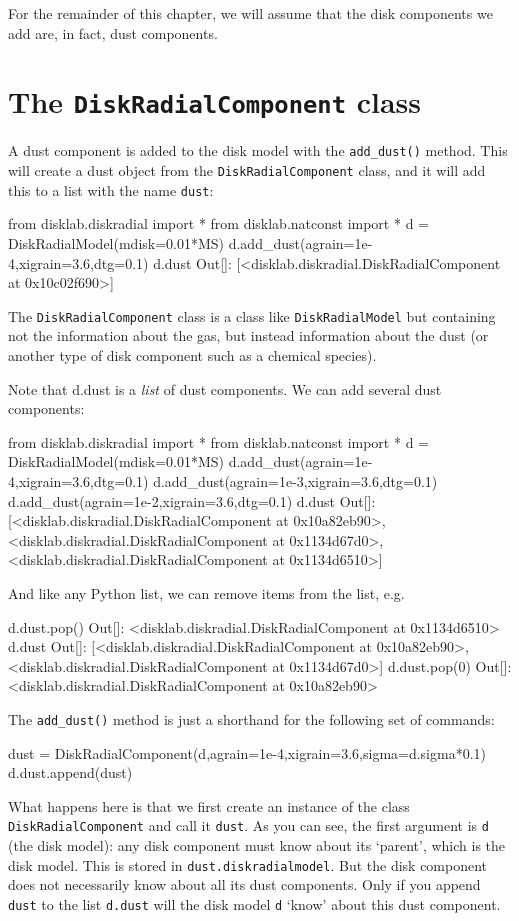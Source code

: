 \documentclass{book}
\newcommand{\code}[1]{{\small\tt #1}}
\begin{document}
For the remainder of this chapter, we will assume that the disk components
we add are, in fact, dust components.

\section{The {\tt DiskRadialComponent} class}
\label{sec-diskcomponent-class}
\label{sec-add-dust}
A dust component is added to the disk model with the \code{add\_dust()}
method. This will create a dust object from the \code{DiskRadialComponent} class, and
it will add this to a list with the name \code{dust}:
\begin{codebox}
from disklab.diskradial import *
from disklab.natconst import *
d = DiskRadialModel(mdisk=0.01*MS)
d.add_dust(agrain=1e-4,xigrain=3.6,dtg=0.1)
d.dust
Out[]: [<disklab.diskradial.DiskRadialComponent at 0x10c02f690>]
\end{codebox}
The \code{DiskRadialComponent} class is a class like \code{DiskRadialModel} but containing
not the information about the gas, but instead information about the dust (or
another type of disk component such as a chemical species).

Note that d.dust is a {\em list} of dust components. We can add several dust
components:
\begin{codebox}
from disklab.diskradial import *
from disklab.natconst import *
d = DiskRadialModel(mdisk=0.01*MS)
d.add_dust(agrain=1e-4,xigrain=3.6,dtg=0.1)
d.add_dust(agrain=1e-3,xigrain=3.6,dtg=0.1)
d.add_dust(agrain=1e-2,xigrain=3.6,dtg=0.1)
d.dust
Out[]:
[<disklab.diskradial.DiskRadialComponent at 0x10a82eb90>,
 <disklab.diskradial.DiskRadialComponent at 0x1134d67d0>,
 <disklab.diskradial.DiskRadialComponent at 0x1134d6510>]
\end{codebox}
And like any Python list, we can remove items from the list, e.g.
\begin{codebox}
d.dust.pop()
Out[]: <disklab.diskradial.DiskRadialComponent at 0x1134d6510>
d.dust
Out[]:
[<disklab.diskradial.DiskRadialComponent at 0x10a82eb90>,
 <disklab.diskradial.DiskRadialComponent at 0x1134d67d0>]
d.dust.pop(0)
Out[]: <disklab.diskradial.DiskRadialComponent at 0x10a82eb90>
\end{codebox}

The \code{add\_dust()} method is just a shorthand for the following set of
commands:
\begin{codebox}
dust = DiskRadialComponent(d,agrain=1e-4,xigrain=3.6,sigma=d.sigma*0.1)
d.dust.append(dust)
\end{codebox}
What happens here is that we first create an instance of the class
\code{DiskRadialComponent} and call it \code{dust}. As you can see, the first
argument is \code{d} (the disk model): any disk component must know
about its `parent', which is the disk model. This is stored in
\code{dust.diskradialmodel}. But the disk component does not necessarily
know about all its dust components. Only if you append \code{dust} to
the list \code{d.dust} will the disk model \code{d} `know' about this
dust component.
\end{document}
